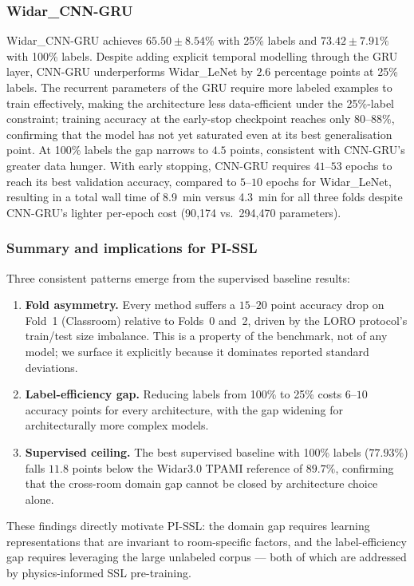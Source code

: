 \documentclass[journal]{IEEEtran}
\begin{document}
\subsubsection*{Widar\_CNN-GRU}
Widar\_CNN-GRU achieves $65.50 \pm 8.54\%$ with 25\% labels and
$73.42 \pm 7.91\%$ with 100\% labels.
Despite adding explicit temporal modelling through the GRU layer,
CNN-GRU underperforms Widar\_LeNet by $2.6$ percentage points at
25\% labels.
The recurrent parameters of the GRU require more labeled examples
to train effectively, making the architecture less data-efficient
under the 25\%-label constraint; training accuracy at the early-stop
checkpoint reaches only $80$--$88\%$, confirming that the model has
not yet saturated even at its best generalisation point.
At 100\% labels the gap narrows to $4.5$ points, consistent with
CNN-GRU's greater data hunger.
With early stopping, CNN-GRU requires $41$--$53$ epochs to reach its
best validation accuracy, compared to $5$--$10$ epochs for
Widar\_LeNet, resulting in a total wall time of 8.9~min versus
4.3~min for all three folds despite CNN-GRU's lighter per-epoch cost
(90{,}174 vs.\ 294{,}470 parameters).

\subsubsection*{Summary and implications for PI-SSL}
Three consistent patterns emerge from the supervised baseline
results:
\begin{enumerate}[leftmargin=*]
  \item \textbf{Fold asymmetry.} Every method suffers a $15$--$20$
  point accuracy drop on Fold~1 (Classroom) relative to Folds~0
  and~2, driven by the LORO protocol's train/test size imbalance.
  This is a property of the benchmark, not of any model; we surface
  it explicitly because it dominates reported standard deviations.
  \item \textbf{Label-efficiency gap.} Reducing labels from 100\% to
  25\% costs $6$--$10$ accuracy points for every architecture, with
  the gap widening for architecturally more complex models.
  \item \textbf{Supervised ceiling.} The best supervised baseline with
  100\% labels ($77.93\%$) falls $11.8$ points below the Widar3.0
  TPAMI reference of $89.7\%$, confirming that the cross-room domain
  gap cannot be closed by architecture choice alone.
\end{enumerate}

These findings directly motivate PI-SSL: the domain gap requires
learning representations that are invariant to room-specific factors,
and the label-efficiency gap requires leveraging the large unlabeled
corpus --- both of which are addressed by physics-informed SSL
pre-training.
\end{document}
